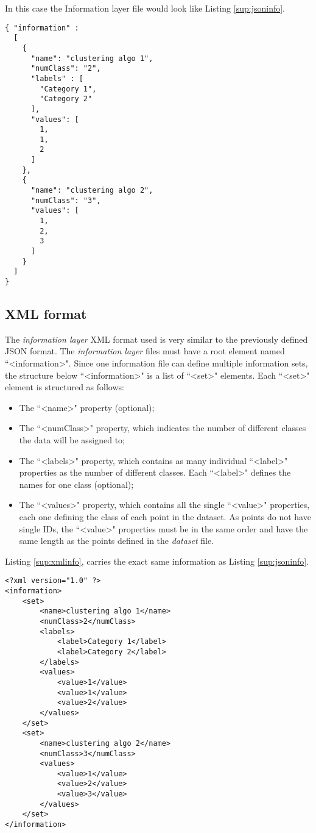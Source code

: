 In this case the Information layer file would look like Listing \ref{sup:jsoninfo}.

\begin{lstlisting}[float,caption=JSON information layer file,label=sup:jsoninfo]
{ "information" :
  [
    {
      "name": "clustering algo 1",
      "numClass": "2",
      "labels" : [
        "Category 1",
        "Category 2"
      ],
      "values": [
        1,
        1,
        2
      ]
    },
    {
      "name": "clustering algo 2",
      "numClass": "3",
      "values": [
        1,
        2,
        3
      ]
    }
  ]
}
\end{lstlisting}

		\subsection{XML format}
The {\it{information layer}} XML format used is very similar to the previously defined JSON format. The {\it{information layer}} files must have a root element named  ``\textless information\textgreater ". Since one information file can define multiple information sets, the structure below ``\textless information\textgreater " is a list of ``\textless set\textgreater " elements. Each ``\textless set\textgreater " element is structured as follows:
\begin{itemize}
\item{The ``\textless name\textgreater " property (optional);}
\item{The ``\textless numClass\textgreater " property, which indicates the number of different classes the data will be assigned to;}
\item{The ``\textless labels\textgreater " property, which contains as many individual ``\textless label\textgreater " properties as the number of different classes. Each ``\textless label\textgreater " defines the names for one class (optional);}
\item{The ``\textless values\textgreater " property, which contains all the single ``\textless value\textgreater " properties, each one defining the class of each point in the dataset. As points do not have single IDs, the ``\textless value\textgreater " properties must be in the same order and have the same length as the points defined in the {\it{dataset}} file.}
\end{itemize}
Listing \ref{sup:xmlinfo}, carries the exact same information as Listing \ref{sup:jsoninfo}.

\begin{lstlisting}[float,caption=XML information layer file,label=sup:xmlinfo]
<?xml version="1.0" ?>
<information>
	<set>
		<name>clustering algo 1</name>
		<numClass>2</numClass>
		<labels>
			<label>Category 1</label>
			<label>Category 2</label>
		</labels>
		<values>
			<value>1</value>
			<value>1</value>
			<value>2</value>
		</values>
	</set>
	<set>
		<name>clustering algo 2</name>
		<numClass>3</numClass>
		<values>
			<value>1</value>
			<value>2</value>
			<value>3</value>
		</values>
	</set>
</information>

\end{lstlisting}



